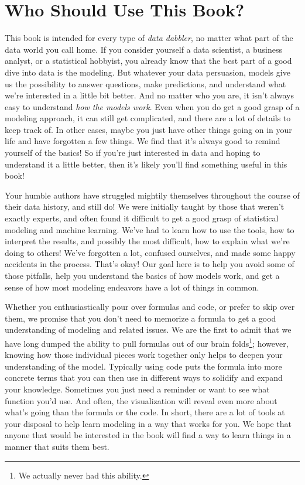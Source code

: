 \documentclass[
  letterpaper,
]{krantz}
\begin{document}
\section{Who Should Use This Book?}\label{who-should-use-this-book}

This book is intended for every type of \emph{data dabbler}, no matter
what part of the data world you call home. If you consider yourself a
data scientist, a business analyst, or a statistical hobbyist, you
already know that the best part of a good dive into data is the
modeling. But whatever your data persuasion, models give us the
possibility to answer questions, make predictions, and understand what
we're interested in a little bit better. And no matter who you are, it
isn't always easy to understand \emph{how the models work}. Even when
you do get a good grasp of a modeling approach, it can still get
complicated, and there are a lot of details to keep track of. In other
cases, maybe you just have other things going on in your life and have
forgotten a few things. We find that it's always good to remind yourself
of the basics! So if you're just interested in data and hoping to
understand it a little better, then it's likely you'll find something
useful in this book!

Your humble authors have struggled mightily themselves throughout the
course of their data history, and still do! We were initially taught by
those that weren't exactly experts, and often found it difficult to get
a good grasp of statistical modeling and machine learning. We've had to
learn how to use the tools, how to interpret the results, and possibly
the most difficult, how to explain what we're doing to others! We've
forgotten a lot, confused ourselves, and made some happy accidents in
the process. That's okay! Our goal here is to help you avoid some of
those pitfalls, help you understand the basics of how models work, and
get a sense of how most modeling endeavors have a lot of things in
common.

Whether you enthusiastically pour over formulas and code, or prefer to
skip over them, we promise that you don't need to memorize a formula to
get a good understanding of modeling and related issues. We are the
first to admit that we have long dumped the ability to pull formulas out
of our brain folds\footnote{We actually never had this ability.};
however, knowing how those individual pieces work together only helps to
deepen your understanding of the model. Typically using code puts the
formula into more concrete terms that you can then use in different ways
to solidify and expand your knowledge. Sometimes you just need a
reminder or want to see what function you'd use. And often, the
visualization will reveal even more about what's going than the formula
or the code. In short, there are a lot of tools at your disposal to help
learn modeling in a way that works for you. We hope that anyone that
would be interested in the book will find a way to learn things in a
manner that suits them best.
\end{document}
